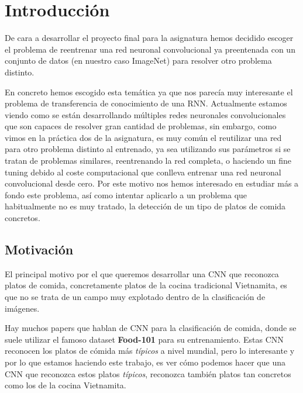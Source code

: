 \section{Introducción}

De cara a desarrollar el proyecto final para la asignatura hemos decidido escoger el problema de reentrenar una red neuronal convolucional ya preentenada con un conjunto de datos (en nuestro caso ImageNet) para resolver otro problema distinto.

En concreto hemos escogido esta temática ya que nos parecía muy interesante el problema de transferencia de conocimiento de una RNN. Actualmente estamos viendo como se están desarrollando múltiples redes neuronales convolucionales que son capaces de resolver gran cantidad de problemas, sin embargo, como vimos en la práctica dos de la asignatura, es muy común el reutilizar una red para otro problema distinto al entrenado, ya sea utilizando sus parámetros si se tratan de problemas similares, reentrenando la red completa, o haciendo un fine tuning debido al coste computacional que conlleva entrenar una red neuronal convolucional desde cero. Por este motivo nos hemos interesado en estudiar más a fondo este problema, así como intentar aplicarlo a un problema que habitualmente no es muy tratado, la detección de un tipo de platos de comida concretos.


\vspace{5 mm}

\subsection{Motivación}

\vspace{5 mm}

El principal motivo por el que queremos desarrollar una CNN que reconozca platos de comida, concretamente platos de la cocina tradicional Vietnamita, es que no se trata de un campo muy explotado dentro de la clasificación de imágenes.

\vspace{3 mm}

Hay muchos papers que hablan de CNN para la clasificación de comida, donde se suele utilizar el famoso dataset \textbf{Food-101} para su entrenamiento. Estas CNN reconocen los platos de cómida más \textit{típicos} a nivel mundial, pero lo interesante y por lo que estamos haciendo este trabajo, es ver cómo podemos hacer que una CNN que reconozca estos platos \textit{típicos}, reconozca también platos tan concretos como los de la cocina Vietnamita.

